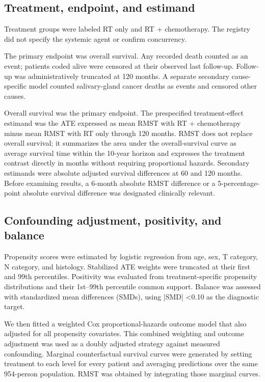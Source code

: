 \documentclass[9pt,twocolumn]{extarticle}
\begin{document}
\subsection{Treatment, endpoint, and estimand}
Treatment groups were labeled RT only and RT + chemotherapy. The registry did not specify the systemic agent or confirm concurrency.\par
The primary endpoint was overall survival. Any recorded death counted as an event; patients coded alive were censored at their observed last follow-up. Follow-up was administratively truncated at 120 months. A separate secondary cause-specific model counted salivary-gland cancer deaths as events and censored other causes.\par
Overall survival was the primary endpoint. The prespecified treatment-effect estimand was the ATE expressed as mean RMST with RT + chemotherapy minus mean RMST with RT only through 120 months. RMST does not replace overall survival; it summarizes the area under the overall-survival curve as average survival time within the 10-year horizon and expresses the treatment contrast directly in months without requiring proportional hazards. Secondary estimands were absolute adjusted survival differences at 60 and 120 months. Before examining results, a 6-month absolute RMST difference or a 5-percentage-point absolute survival difference was designated clinically relevant.\par
\subsection{Confounding adjustment, positivity, and balance}
Propensity scores were estimated by logistic regression from age, sex, T category, N category, and histology. Stabilized ATE weights were truncated at their first and 99th percentiles. Positivity was evaluated from treatment-specific propensity distributions and their 1st--99th percentile common support. Balance was assessed with standardized mean differences (SMDs), using |SMD| <0.10 as the diagnostic target.\par
We then fitted a weighted Cox proportional-hazards outcome model that also adjusted for all propensity covariates. This combined weighting and outcome adjustment was used as a doubly adjusted strategy against measured confounding. Marginal counterfactual survival curves were generated by setting treatment to each level for every patient and averaging predictions over the same 954-person population. RMST was obtained by integrating those marginal curves.\par
\end{document}
